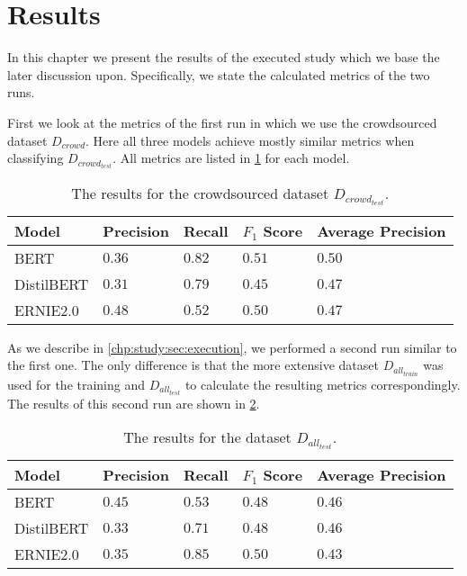 \section{Results}
\label{chp:study:sec:results}
In this chapter we present the results of the executed study which we base the later discussion upon.
Specifically, we state the calculated metrics of the two runs.

First we look at the metrics of the first run in which we use the crowdsourced dataset $D_{crowd}$.
Here all three models achieve mostly similar metrics when classifying $D_{crowd_{test}}$.
All metrics are listed in \cref{tab:study:results:first_run} for each model.
\begin{table}[htpb]
    \centering
    \begin{tabular}{l | l l l l }
        \toprule
         Model & Precision & Recall & $F_1$ Score & Average Precision \\
        \midrule
        \ac{BERT} & $0.36$ & $0.82$ & $0.51$ & $0.50$\\
        \ac{DistilBERT} & $0.31$ & $0.79$ & $0.45$ & $0.47$\\
        \ac{ERNIE2.0} & $0.48$ & $0.52$ & $0.50$ & $0.47$\\
        \bottomrule
    \end{tabular}
    \caption[Study Results on Crowdsourced Dataset]{The results for the crowdsourced dataset $D_{crowd_{test}}$.}\label{tab:study:results:first_run}
\end{table}

As we describe in \cref{chp:study:sec:execution}, we performed a second run similar to the first one.
The only difference is that the more extensive dataset $D_{all_{train}}$ was used for the training and $D_{all_{test}}$ to calculate the resulting metrics correspondingly.
The results of this second run are shown in \cref{tab:study:results:second_run}.
\begin{table}[htpb]
    \centering
    \begin{tabular}{l | l l l l }
        \toprule
         Model & Precision & Recall & $F_1$ Score & Average Precision \\
        \midrule
        \ac{BERT} & $0.45$ & $0.53$ & $0.48$ & $0.46$\\
        \ac{DistilBERT} & $0.33$ & $0.71$ & $0.48$ & $0.46$\\
        \ac{ERNIE2.0} & $0.35$ & $0.85$ & $0.50$ & $0.43$\\
        \bottomrule
    \end{tabular}
    \caption[Study Results on Complete Dataset]{The results for the dataset $D_{all_{test}}$.}\label{tab:study:results:second_run}
\end{table}
